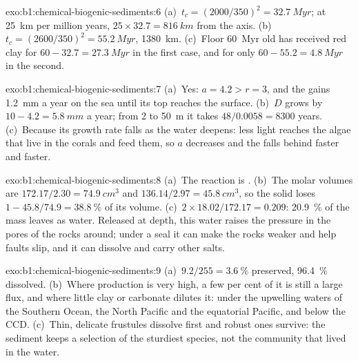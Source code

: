 \begin{solution}{exo:b1:chemical-biogenic-sediments:6}
(a)~$t_c = (2000/350)^2 = \qty{32.7}{Myr}$; at \qty{25}{km} per million years,
$25\times32.7 = \qty{816}{km}$ from the axis. (b)~$t_c = (2600/350)^2 =
\qty{55.2}{Myr}$, \qty{1380}{km}. (c)~Floor \qty{60}{Myr} old has received red
clay for $60 - 32.7 = \qty{27.3}{Myr}$ in the first case, and for only
$60 - 55.2 = \qty{4.8}{Myr}$ in the second.
\end{solution}

\begin{solution}{exo:b1:chemical-biogenic-sediments:7}
(a)~Yes: $a = 4.2 > r = 3$, and the  gains \qty{1.2}{mm} a year on the sea
until its top reaches the surface. (b)~$D$ grows by $10 - 4.2 = \qty{5.8}{mm}$ a
year; from 2 to \qty{50}{m} it takes $48/0.0058 = \num{8300}$ years. (c)~Because
its growth rate falls as the water deepens: less light reaches the algae that
live in the corals and feed them, so $a$ decreases and the  falls behind
faster and faster.
\end{solution}

\begin{solution}{exo:b1:chemical-biogenic-sediments:8}
(a)~The reaction is . (b)~The molar volumes are $172.17/2.30 =
\qty{74.9}{cm^3}$ and $136.14/2.97 = \qty{45.8}{cm^3}$, so the solid loses
$1 - 45.8/74.9 = \qty{38.8}{\%}$ of its volume. (c)~$2\times18.02/172.17 = 0.209$:
\qty{20.9}{\%} of the mass leaves as water. Released at depth, this water
raises the pressure in the pores of the rocks around; under a seal it can make
the rocks weaker and help faults slip, and it can dissolve and carry other
salts.
\end{solution}

\begin{solution}{exo:b1:chemical-biogenic-sediments:9}
(a)~$9.2/255 = \qty{3.6}{\%}$ preserved, \qty{96.4}{\%} dissolved. (b)~Where
production is very high, a few per cent of it is still a large flux, and where
little clay or carbonate dilutes it: under the upwelling waters of the Southern
Ocean, the North Pacific and the equatorial Pacific, and below the CCD.
(c)~Thin, delicate frustules dissolve first and robust ones survive: the
sediment keeps a selection of the sturdiest species, not the community that
lived in the water.
\end{solution}

